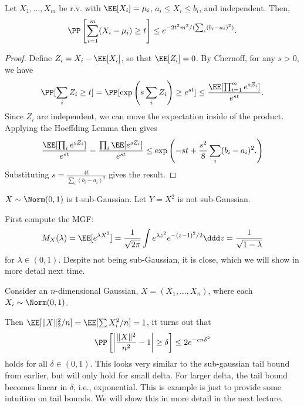 \begin{theorem}

Let $X_1,\hdots,X_m$ be r.v. with $\EE[X_i]=\mu_i$, $a_i\leq X_i\leq b_i$, and independent. Then, 
\[\PP\left[\sum_{i=1}^m(X_i-\mu_i)\geq t\right]\leq e^{-2t^2m^2/(\sum_i (b_i-a_i)^2)}.\] 
\end{theorem}

\begin{proof}
	Define $Z_i = X_i-\EE[X_i]$, so that $\EE[Z_i] = 0$. By Chernoff, for any $s>0$, we have 
	\[\PP[\sum_i Z_i\geq t] = \PP[\exp\left(s\sum_i Z_i\right)\geq e^{st}] \leq \frac{\EE[\prod_{i=1}^m e^{sZ_i}]}{e^{st}}.\] 
	Since $Z_i$ are independent, we can move the expectation inside of the product. Applying the Hoeffding Lemma then gives
	\[\frac{\EE[\prod_i e^{sZ_i}]}{e^{st}} = \frac{\prod_i \EE[e^{sZ_i}]}{e^{st}}\leq \exp\left(-st + \frac{s^2}{8}\sum_i (b_i-a_i)^2.\right)\] 
	Substituting $s = \frac{4t}{\sum_i (b_i-a_i)^2}$ gives the result.
\end{proof}
\begin{example}
\exlabel

$X\sim \Norm(0,1)$ is $1$-sub-Gaussian. Let $Y=X^2$ is not sub-Gaussian. 
\end{example}
First compute the MGF:
\begin{align*}
	M_{X}(\lambda) = \EE[e^{\lambda X^2}] = \frac{1}{\sqrt{2\pi}}\int e^{\lambda z^2}e^{-(z-1)^2/2}\ddd z = \frac{1}{\sqrt{1-\lambda}}
\end{align*}
for $\lambda\in (0,1)$. Despite not being sub-Gaussian, it is close, which we will show in more detail next time. 


\begin{example}
\exlabel

Consider an $n$-dimensional Gaussian, $X = (X_1, \hdots, X_n)$, where each $X_i\sim \Norm(0,1)$. 
\end{example}
Then $\EE[\lVert X\rVert_2^2 / n] = \EE[\sum X_i^2 / n] = 1$, it turns out that 
\[\PP\left[ \left\vert\frac{\lVert X\rVert^2}{n^2} - 1\right\vert \geq \delta\right] \leq 2e^{-cn\delta^2}\] 
holds for all $\delta\in (0,1)$. This looks very similar to the sub-gaussian tail bound from earlier, but will only hold for small delta. For larger delta, the tail bound becomes linear in $\delta$, i.e., exponential. This is example is just to provide some intuition on tail bounds. We will show this in more detail in the next lecture. 

